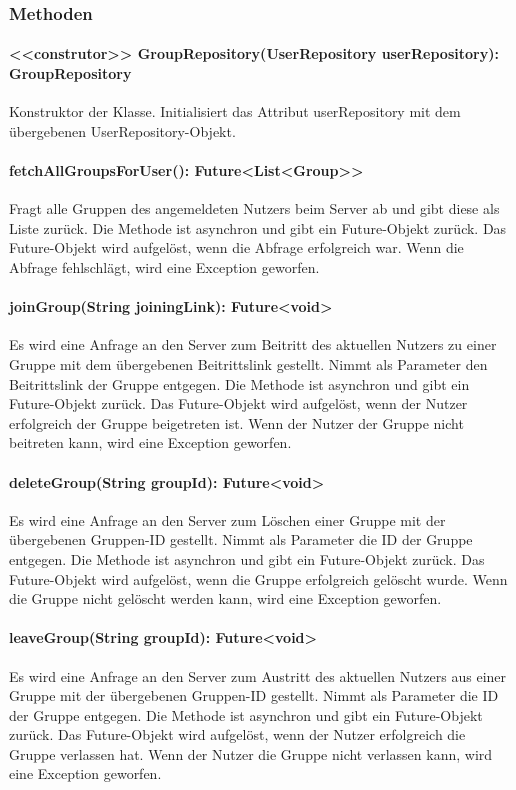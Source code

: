\documentclass[parskip=full]{scrartcl}
\begin{document}
\subsubsection*{Methoden}
\paragraph{<<construtor>> GroupRepository(UserRepository userRepository): GroupRepository}
Konstruktor der Klasse. Initialisiert das Attribut userRepository mit dem übergebenen UserRepository-Objekt.
\paragraph{fetchAllGroupsForUser(): Future<List<Group>>}
Fragt alle Gruppen des angemeldeten Nutzers beim Server ab und gibt diese als Liste zurück. Die Methode ist asynchron und gibt ein Future-Objekt zurück. Das Future-Objekt wird aufgelöst, wenn die Abfrage erfolgreich war. Wenn die Abfrage fehlschlägt, wird eine Exception geworfen.
\paragraph{joinGroup(String joiningLink): Future<void>}
Es wird eine Anfrage an den Server zum Beitritt des aktuellen Nutzers zu einer Gruppe mit dem übergebenen Beitrittslink gestellt. Nimmt als Parameter den Beitrittslink der Gruppe entgegen. Die Methode ist asynchron und gibt ein Future-Objekt zurück. Das Future-Objekt wird aufgelöst, wenn der Nutzer erfolgreich der Gruppe beigetreten ist. Wenn der Nutzer der Gruppe nicht beitreten kann, wird eine Exception geworfen.
\paragraph{deleteGroup(String groupId): Future<void>}
Es wird eine Anfrage an den Server zum Löschen einer Gruppe mit der übergebenen Gruppen-ID gestellt. Nimmt als Parameter die ID der Gruppe entgegen. Die Methode ist asynchron und gibt ein Future-Objekt zurück. Das Future-Objekt wird aufgelöst, wenn die Gruppe erfolgreich gelöscht wurde. Wenn die Gruppe nicht gelöscht werden kann, wird eine Exception geworfen.
\paragraph{leaveGroup(String groupId): Future<void>}
Es wird eine Anfrage an den Server zum Austritt des aktuellen Nutzers aus einer Gruppe mit der übergebenen Gruppen-ID gestellt. Nimmt als Parameter die ID der Gruppe entgegen. Die Methode ist asynchron und gibt ein Future-Objekt zurück. Das Future-Objekt wird aufgelöst, wenn der Nutzer erfolgreich die Gruppe verlassen hat. Wenn der Nutzer die Gruppe nicht verlassen kann, wird eine Exception geworfen.
\end{document}
